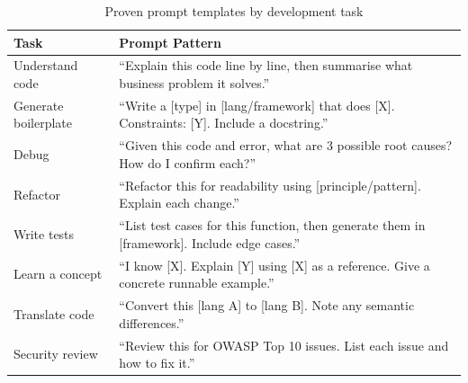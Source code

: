 \begin{table}[htbp]
\centering
\caption{Proven prompt templates by development task}
\begin{tabularx}{\linewidth}{l X}
\toprule
\textbf{Task} & \textbf{Prompt Pattern} \\
\midrule
Understand code     & ``Explain this code line by line, then summarise what business
                       problem it solves.'' \\[4pt]
Generate boilerplate & ``Write a [type] in [lang/framework] that does [X].
                       Constraints: [Y]. Include a docstring.'' \\[4pt]
Debug               & ``Given this code and error, what are 3 possible root causes?
                       How do I confirm each?'' \\[4pt]
Refactor            & ``Refactor this for readability using [principle/pattern].
                       Explain each change.'' \\[4pt]
Write tests         & ``List test cases for this function, then generate them
                       in [framework]. Include edge cases.'' \\[4pt]
Learn a concept     & ``I know [X]. Explain [Y] using [X] as a reference.
                       Give a concrete runnable example.'' \\[4pt]
Translate code      & ``Convert this [lang A] to [lang B]. Note any
                       semantic differences.'' \\[4pt]
Security review     & ``Review this for OWASP Top 10 issues.
                       List each issue and how to fix it.'' \\
\bottomrule
\end{tabularx}
\label{tab:dev-prompts}
\end{table}
